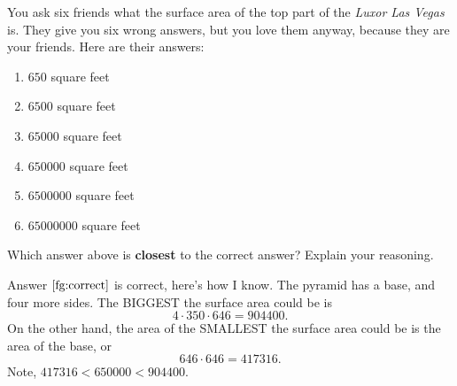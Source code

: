 \documentclass[handout,nooutcomes,noauthor,hints1,12pt]{ximera}
\begin{document}
 \begin{question}%
    You ask six friends what the surface area of the top part of the
    \textit{Luxor Las Vegas} is. They give you six wrong answers, but
    you love them anyway, because they are your friends. Here are
    their answers:
    \begin{enumerate}
    \item $650$ square feet
    \item $6500$ square feet
    \item $65000$ square feet
    \item\label{fg:correct} $650000$ square feet
    \item $6500000$ square feet
    \item $65000000$ square feet
    \end{enumerate}
      Which answer above is \textbf{closest} to the correct answer?
      Explain your reasoning.
      \begin{freeResponse}
        Answer $\ref{fg:correct}$ is correct, here's how I know. The pyramid has a
        base, and four more sides. The BIGGEST the surface area could
        be is
        \[
        4\cdot 350\cdot 646 = 904400.
        \]
        On the other hand, the area of the SMALLEST the surface area could be is
        the area of the base, or
        \[
        646\cdot 646 = 417316.
        \]
        Note, $417316 < 650000 <  904400$.        
      \end{freeResponse}
\end{question}
\end{document}
